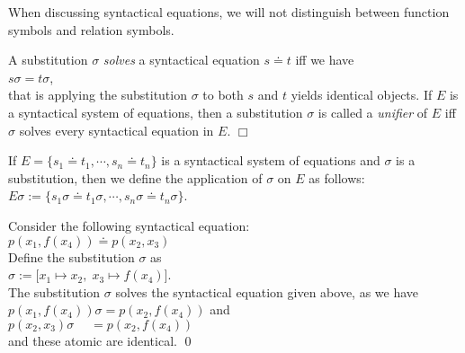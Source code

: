 When discussing syntactical equations, we will not distinguish between function symbols
and relation symbols.


\begin{Definition}[Unifier]
A  substitution $\sigma$ \emph{solves} a syntactical equation $s \doteq t$ iff we have
\\[0.2cm]
\hspace*{1.3cm}
$s\sigma = t\sigma$, 
\\[0.2cm]
that is applying the substitution $\sigma$ to both $s$ and $t$ yields identical objects.
If $E$ is a syntactical system of equations, then a substitution $\sigma$ is called a
\emph{unifier} 
of $E$ iff  $\sigma$ solves every syntactical equation in  $E$. 
 \hspace*{\fill} $\Box$  
\end{Definition}
If $E = \{ s_1 \doteq t_1, \cdots, s_n \doteq t_n \}$ is a syntactical system of equations
and  $\sigma$ is a substitution, then we define the application of $\sigma$ on $E$ as follows: \\[0.2cm]
\hspace*{1.3cm}  $E\sigma := \{ s_1\sigma \doteq t_1\sigma, \cdots, s_n\sigma \doteq t_n\sigma \}$.
\vspace{0.3cm}

\example
Consider the following syntactical equation:  
\\[0.2cm]
\hspace*{1.3cm} $p(x_1, f(x_4)) \doteq p( x_2, x_3)$ \\[0.2cm]
Define the substitution $\sigma$ as \\[0.2cm]
\hspace*{1.3cm} $\sigma := \big[ x_1 \mapsto x_2,\; x_3 \mapsto f(x_4) \big]$. \\[0.2cm]
The substitution $\sigma$ solves the syntactical equation given above, as we have \\[0.2cm]
\hspace*{1.3cm} $p(x_1, f(x_4))\sigma = p(x_2, f(x_4))$ \quad and \quad \\[0.2cm]
\hspace*{1.3cm} $p(x_2, x_3)\sigma \;\quad = p(x_2, f(x_4))$ \\[0.2cm]
and these atomic \formulae are identical. \qed
\vspace{0.3cm}

